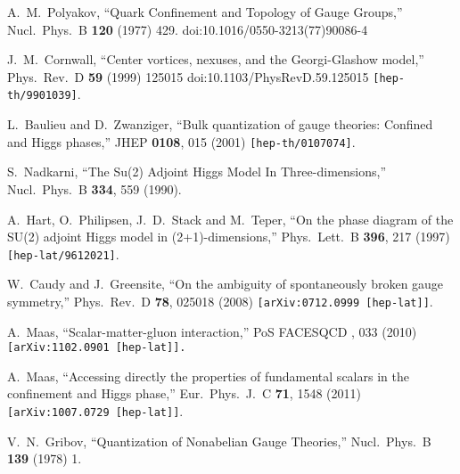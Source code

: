 \documentclass[a4paper,11pt,british,twosides]{book}%
\numberwithin{equation}{section}
\begin{document}
\begin{thebibliography}{9}
  A.~M.~Polyakov,
  ``Quark Confinement and Topology of Gauge Groups,''
  Nucl.\ Phys.\ B {\bf 120} (1977) 429.
  doi:10.1016/0550-3213(77)90086-4

  J.~M.~Cornwall,
  ``Center vortices, nexuses, and the Georgi-Glashow model,''
  Phys.\ Rev.\ D {\bf 59} (1999) 125015
  doi:10.1103/PhysRevD.59.125015
  {\tt [hep-th/9901039]}.

  L.~Baulieu and D.~Zwanziger,
  ``Bulk quantization of gauge theories: Confined and Higgs phases,''
  JHEP {\bf 0108}, 015 (2001)
  {\tt [hep-th/0107074]}.

  S.~Nadkarni,
  ``The Su(2) Adjoint Higgs Model In Three-dimensions,''
  Nucl.\ Phys.\ B {\bf 334}, 559 (1990).


  A.~Hart, O.~Philipsen, J.~D.~Stack and M.~Teper,
  ``On the phase diagram of the SU(2) adjoint Higgs model in (2+1)-dimensions,''
  Phys.\ Lett.\ B {\bf 396}, 217 (1997)
  {\tt [hep-lat/9612021]}.



  W.~Caudy and J.~Greensite,
  ``On the ambiguity of spontaneously broken gauge symmetry,''
  Phys.\ Rev.\ D {\bf 78}, 025018 (2008)
  {\tt [arXiv:0712.0999 [hep-lat]]}.


  A.~Maas,
  ``Scalar-matter-gluon interaction,''
  PoS FACESQCD {\bf }, 033 (2010)
  {\tt [arXiv:1102.0901 [hep-lat]].}



  A.~Maas,
  ``Accessing directly the properties of fundamental scalars in the confinement and Higgs
  phase,''
  Eur.\ Phys.\ J.\ C {\bf 71}, 1548 (2011)
  {\tt [arXiv:1007.0729 [hep-lat]]}.

  V.~N.~Gribov,
  ``Quantization of Nonabelian Gauge Theories,''
  Nucl.\ Phys.\ B {\bf 139} (1978) 1.


\end{thebibliography}
\end{document}
